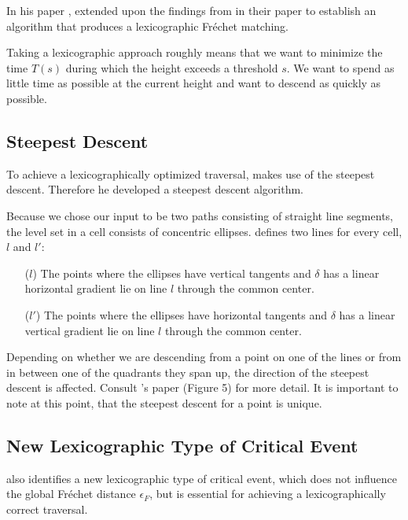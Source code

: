 In his \citeyear{rotelex} paper , \citeauthor{rotelex} extended upon the findings from \citeauthor*{altgodau} in their paper  to establish an algorithm that produces a lexicographic Fréchet matching.

Taking a lexicographic approach roughly means that we want to minimize the time $T(s)$ during which the height exceeds a threshold $s$.\cite{rotelex} We want to spend as little time as possible at the current height and want to descend as quickly as possible.

\subsection{Steepest Descent}

To achieve a lexicographically optimized traversal, \citeauthor{rotelex} makes use of the steepest descent. Therefore he developed a steepest descent algorithm.

Because we chose our input to be two paths consisting of straight line segments, the level set in a cell consists of concentric ellipses. \citeauthor{rotelex} defines two lines for every cell, $l$ and $l'$:

\begin{itemize}
	\item [($l$)] The points where the ellipses have vertical tangents and $\delta$ has a linear horizontal gradient lie on line $l$ through the common center.\cite{rotelex}
	\item [($l'$)] The points where the ellipses have horizontal tangents and $\delta$ has a linear vertical gradient lie on line $l$ through the common center.\cite{rotelex}
\end{itemize}

Depending on whether we are descending from a point on one of the lines or from in between one of the quadrants they span up, the direction of the steepest descent is affected. Consult \citeauthor{rotelex}'s paper \cite{rotelex} (Figure 5) for more detail. It is important to note at this point, that the steepest descent for a point is unique.


\subsection{New Lexicographic Type of Critical Event}

\citeauthor{rotelex} also identifies a new lexicographic type of critical event, which does not influence the global Fréchet distance $\epsilon_F$, but is essential for achieving a lexicographically correct traversal.

